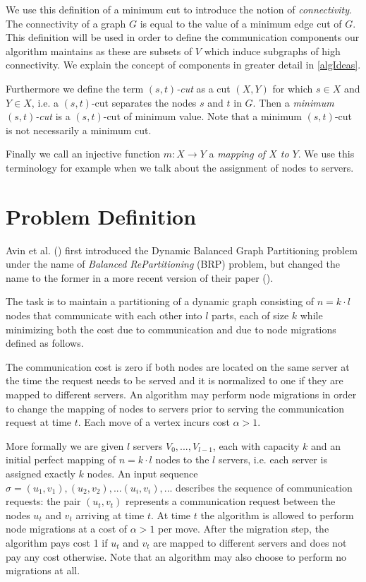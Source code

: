 \documentclass[a4paper, 10pt]{article}
\theoremstyle{definition}
\begin{document}
	We use this definition of a minimum cut to introduce the notion of \textit{connectivity}. The connectivity of a graph $G$ is equal to the value of a minimum edge cut of $G$. This definition will be used in order to define the communication components our algorithm maintains as these are subsets of $V$ which induce subgraphs of high connectivity. We explain the concept of components in greater detail in \cref{algIdeas}.
	
	Furthermore we define the term $(s,t)$\textit{-cut} as a cut $(X,Y)$ for which $s\in X$ and $Y\in X$, i.e. a $(s,t)$-cut separates the nodes $s$ and $t$ in $G$. Then a \textit{minimum $(s,t)$-cut} is a $(s,t)$-cut of minimum value. Note that a minimum $(s,t)$-cut is not necessarily a minimum cut.
	
	Finally we call an injective function $m:X\rightarrow Y$ a \textit{mapping of $X$ to $Y$}. We use this terminology for example when we talk about the assignment of nodes to servers.
	
	
	\section{Problem Definition}
	\label{problem_definition_section}
	
	Avin et al. (\cite{Avin2016}) first introduced the Dynamic Balanced Graph Partitioning problem under the name of \textit{Balanced RePartitioning} (BRP) problem, but changed the name to the former in a more recent version of their paper (\cite{Avin2015}).
	
	The task is to maintain a partitioning of a dynamic graph consisting of $n=k\cdot l$ nodes that communicate with each other into $l$ parts, each of size $k$ while minimizing both the cost due to communication and due to node migrations defined as follows. 
	
	The communication cost is zero if both nodes are located on the same server at the time the request needs to be served and it is normalized to one if they are mapped to different servers. An algorithm may perform node migrations in order to change the mapping of nodes to servers prior to serving the communication request at time $t$. Each move of a vertex incurs cost $\alpha>1$.
	
	More formally we are given $l$ servers $V_0,...,V_{l-1}$, each with capacity $k$ and an initial perfect mapping of $n=k\cdot l$ nodes to the $l$ servers, i.e. each server is assigned exactly $k$ nodes. An input sequence $\sigma=(u_1, v_1), (u_2, v_2),...(u_i,v_i),...$ describes the sequence of communication requests: the pair $(u_t, v_t)$ represents a communication request between the nodes $u_t$ and $v_t$ arriving at time $t$. At time $t$ the algorithm is allowed to perform node migrations at a cost of $\alpha>1$ per move. After the migration step, the algorithm pays cost 1 if $u_t$ and $v_t$ are mapped to different servers and does not pay any cost otherwise. Note that an algorithm may also choose to perform no migrations at all.
	
\end{document}
